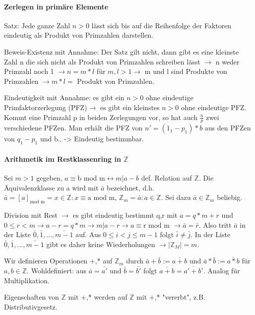 \documentclass[a4paper]{article}
\begin{document}
\begin{multicols}{3}
    \paragraph{Zerlegen in primäre Elemente}
    Satz: Jede ganze Zahl $n>0$ lässt sich bis auf die Reihenfolge der Faktoren eindeutig als Produkt von Primzahlen darstellen.
    
    Beweis-Existenz mit Annahme: Der Satz gilt nicht, dann gibt es eine kleinste Zahl n die sich nicht als Produkt von Primzahlen schreiben lässt $\rightarrow$ n weder Primzahl noch 1 $\rightarrow n=m*l$ für $m,l>1 \rightarrow$ m und l sind Produkte von Primzahlen $\rightarrow m*l=$ Produkt von Primzahlen.
    
    Eindeutigkeit mit Annahme: es gibt ein $n>0$ ohne eindeutige Primfaktorzerlegung (PFZ)$\rightarrow$ es gibt ein kleinstes $n>0$ ohne eindeutige PFZ. Kommt eine Primzahl p in beiden Zerlegungen vor, so hat auch $\frac{n}{p}$ zwei verschiedene PFZen. Man erhält die PFZ von $n'=(1_1-p_1)*b$ aus den PFZen von $q_1-p_1$ und b.. -> Eindeutig bestimmbar.
    
    \paragraph{Arithmetik im Restklassenring in $\mathbb{Z}$}
    Sei $m > 1$ gegeben, $a\equiv \text{b mod m} \leftrightarrow m|a-b$ def. Relation auf $\mathbb{Z}$. Die Äquivalenzklasse zu a wird mit $\bar{a}$ bezeichnet, d.h. $\bar{a}=[a]_{\text{mod m}}={x\in \mathbb{Z}: x\equiv \text{a mod m}}$, $\mathbb{Z}_m={\bar{a}:a\in \mathbb{Z}}$. Sei dazu $\bar{a}\in \mathbb{Z}_m$ beliebig.
    
    Division mit Rest $\rightarrow$ es gibt eindeutig bestimmt q,r mit $a=q*m+r$ und $0\leq r < m \rightarrow a-r=q*m \rightarrow m| a-r \rightarrow a\equiv \text{r mod m } \rightarrow \bar{a}=\bar{r}$. Also tritt $\bar{a}$ in der Liste $\bar{0},\bar{1},...,\bar{m-1}$ auf. Aus $0\leq i < j \leq m-1$ folgt $\bar{i}\not=\bar{j}$. In der Liste $\bar{0},\bar{1},...,\bar{m-1}$ gibt es daher keine Wiederholungen $\rightarrow |\mathbb{Z}_M|=m$.
    
    Wir definieren Operationen +,* auf $\mathbb{Z}_m$ durch $\bar{a}+\bar{b}:= \bar{a+b}$ und $\bar{a}*\bar{b}:=\bar{a*b}$ für $a,b\in \mathbb{Z}$. 
    Wohldefiniert: aus $\bar{a}=\bar{a'}$ und $\bar{b}=\bar{b'}$ folgt $\bar{a+b}=\bar{a'+b'}$. Analog für Multiplikation.
    
    Eigenschaften von $\mathbb{Z}$ mit +,* werden auf $\mathbb{Z}$ mit +,* "vererbt", z.B. Distributivgesetz.
    

\end{multicols}
\end{document}
